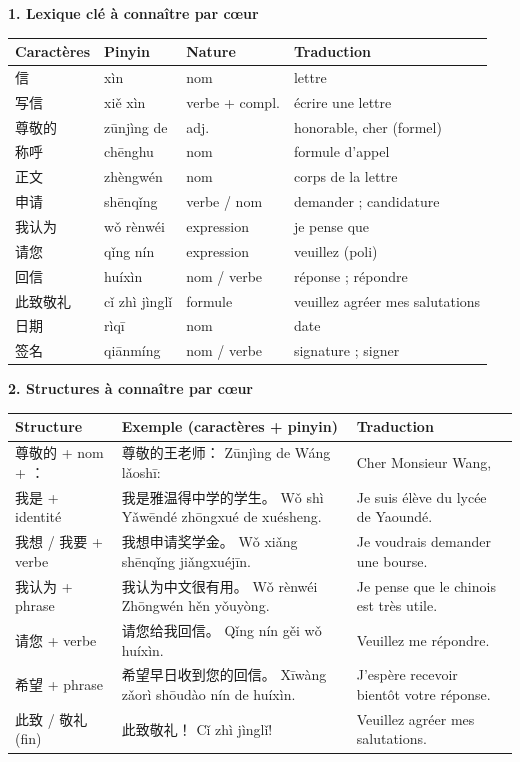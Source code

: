 \documentclass[11pt]{article}
\begin{document}
\begin{bilan}
\textbf{1. Lexique clé à connaître par cœur}

\begin{center}
\begin{tabularx}{\linewidth}{|X|X|X|X|}
\hline
\rowcolor{popblueL} Caractères & Pinyin & Nature & Traduction \\
\hline
信 & xìn & nom & lettre \\
\hline
写信 & xiě xìn & verbe + compl. & écrire une lettre \\
\hline
尊敬的 & zūnjìng de & adj. & honorable, cher (formel) \\
\hline
称呼 & chēnghu & nom & formule d'appel \\
\hline
正文 & zhèngwén & nom & corps de la lettre \\
\hline
申请 & shēnqǐng & verbe / nom & demander ; candidature \\
\hline
我认为 & wǒ rènwéi & expression & je pense que \\
\hline
请您 & qǐng nín & expression & veuillez (poli) \\
\hline
回信 & huíxìn & nom / verbe & réponse ; répondre \\
\hline
此致敬礼 & cǐ zhì jìnglǐ & formule & veuillez agréer mes salutations \\
\hline
日期 & rìqī & nom & date \\
\hline
签名 & qiānmíng & nom / verbe & signature ; signer \\
\hline
\end{tabularx}
\end{center}

\textbf{2. Structures à connaître par cœur}

\begin{center}
\begin{tabularx}{\linewidth}{|X|X|X|}
\hline
\rowcolor{popblueL} Structure & Exemple (caractères + pinyin) & Traduction \\
\hline
尊敬的 + nom + ： & 尊敬的王老师： Zūnjìng de Wáng lǎoshī: & Cher Monsieur Wang, \\
\hline
我是 + identité & 我是雅温得中学的学生。 Wǒ shì Yǎwēndé zhōngxué de xuésheng. & Je suis élève du lycée de Yaoundé. \\
\hline
我想 / 我要 + verbe & 我想申请奖学金。 Wǒ xiǎng shēnqǐng jiǎngxuéjīn. & Je voudrais demander une bourse. \\
\hline
我认为 + phrase & 我认为中文很有用。 Wǒ rènwéi Zhōngwén hěn yǒuyòng. & Je pense que le chinois est très utile. \\
\hline
请您 + verbe & 请您给我回信。 Qǐng nín gěi wǒ huíxìn. & Veuillez me répondre. \\
\hline
希望 + phrase & 希望早日收到您的回信。 Xīwàng zǎorì shōudào nín de huíxìn. & J'espère recevoir bientôt votre réponse. \\
\hline
此致 / 敬礼 (fin) & 此致敬礼！ Cǐ zhì jìnglǐ! & Veuillez agréer mes salutations. \\
\hline
\end{tabularx}
\end{center}


\end{bilan}
\end{document}
